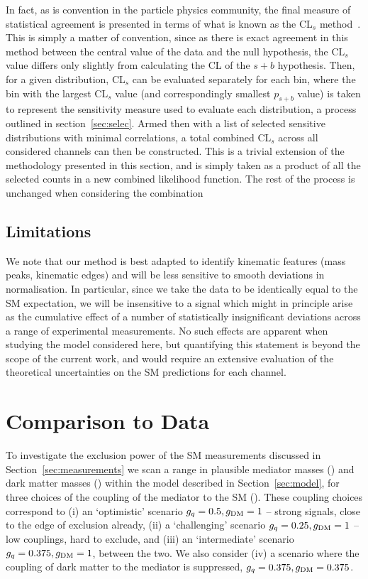 \documentclass[floatfix]{article}
\begin{document}
In fact, as is convention in the particle physics community, the final measure of statistical agreement is presented in terms of what is known as the CL$_{s}$ 
method~\cite{Junk:1999kv,Read:2002hq}. This is simply a matter of convention, since as there is exact agreement in this method between the central value of the 
data and the null hypothesis, the CL$_{s}$ value differs only slightly from calculating the CL of the $s+b$ hypothesis. Then, for a given distribution, CL$_{s}$ 
can be evaluated separately for each bin, where the bin with the largest CL$_{s}$ value (and correspondingly smallest $p_{s+b}$ value) is taken to represent the 
sensitivity measure used to evaluate each distribution, a process outlined in section~\ref{sec:selec}. Armed then with a list of selected sensitive 
distributions with minimal correlations, a total combined CL$_{s}$ across all considered channels can then be constructed. This is a trivial extension of 
the methodology presented in this section, and is simply taken as a product of all the selected counts in a new combined likelihood function. 
The rest of the process is unchanged when considering the combination


\subsection{Limitations}

We note that our method is best adapted to identify kinematic features (mass peaks, kinematic edges) and will be less sensitive to smooth
deviations in normalisation. In particular, since we take the data to be identically equal to the SM expectation, we will be insensitive 
to a signal which might in principle arise as the cumulative effect of a number of statistically insignificant deviations 
across a range of experimental measurements.
No such effects are apparent when studying the model considered here, but quantifying this statement is beyond the scope of the current work, 
and would require an extensive evaluation of the theoretical uncertainties on the SM predictions for each channel.


\section{Comparison to Data}\label{sec:kinematics}

To investigate the exclusion power of the SM measurements discussed in Section~\ref{sec:measurements} we scan a range in 
plausible mediator masses (\MZP) and dark matter masses (\MDM) within the model described in Section~\ref{sec:model}, for three choices of
the coupling of the mediator to the SM (\GQ). These coupling choices correspond to (i) an `optimistic' scenario $g_{q} = 0.5, g_{\rm DM} = 1$ -- strong signals, 
close to the edge of exclusion already, (ii) a `challenging' scenario $g_{q} = 0.25, g_{\rm DM} = 1$ -- low couplings, hard to exclude, 
and (iii) an `intermediate' scenario $g_{q} = 0.375, g_{\rm DM} = 1$, between the two. We also consider (iv) a scenario where the coupling of dark matter to the mediator is
suppressed, $g_{q} = 0.375, g_{\rm DM} = 0.375$.
\end{document}
